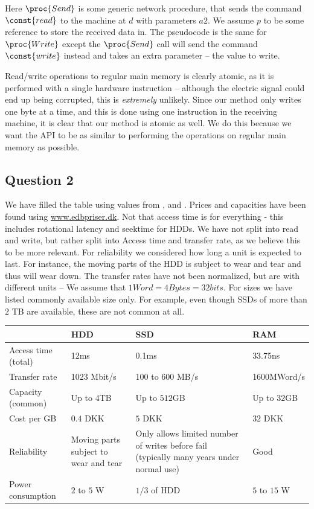 \documentclass[a4paper,final]{article}
\begin{document}
Here $\proc{Send}$ is some generic network procedure, that sends the command
$\const{read}$ to the machine at $d$ with parameters $a2$. We assume $p$ to
be some reference to store the received data in. The pseudocode
is the same for $\proc{Write}$ except the $\proc{Send}$ call will send the
command $\const{write}$ instead and takes an extra parameter -- the value to
write.

Read/write operations to regular main memory is clearly atomic, as it is
performed with a single hardware instruction -- although the electric signal
could end up being corrupted, this is \emph{extremely} unlikely. Since our
method only writes one byte at a time, and this is done using one instruction
in the receiving machine, it is clear that our method is atomic as well. We do
this because we want the API to be as similar to performing the operations on
regular main memory as possible.


\subsection*{Question 2}

We have filled the table using values from \cite{WikiSSDHDD}, \cite{WikiDRAM}
and \cite{PowerConsump}. Prices and capacities have been found using
\url{www.edbpriser.dk}. Not that access time is for everything - this
includes rotational latency and seektime for HDDs. We have not split into read
and write, but rather split into Access time and transfer rate, as we
believe this to be more relevant. For reliability we considered how long a
unit is expected to last. For instance, the moving parts of the HDD is
subject to wear and tear and thus will wear down. The transfer rates have
not been normalized, but are with different units -- We assume that
$1 Word = 4 Bytes = 32 bits$. For sizes we have listed commonly available
size only. For example, even though SSDs of more than $2$ TB are available,
these are not common at all.

\begin{table}[htbp]
    \centering
    \begin{tabular}{ l | p{} | p{} | p{} }
        \toprule
        & \textbf{HDD} & \textbf{SSD} & \textbf{RAM} \\
        \midrule
        Access time (total) & 12ms & 0.1ms & 33.75ns \\
        Transfer rate & 1023 Mbit/s & 100 to 600 MB/s & 1600MWord/s \\
        Capacity (common) & Up to $4$TB & Up to $512$GB & Up to $32$GB \\
        Cost per GB & $0.4$ DKK & $5$ DKK & $32$ DKK \\
        Reliability
            & Moving parts subject to wear and tear
            & Only allows limited number of writes before fail (typically many years under normal use)
            & Good \\
        Power consumption & $2$ to $5$ W & $1/3$ of HDD & $5$ to $15$ W \\
        \bottomrule
    \end{tabular}
\end{table}
\end{document}
